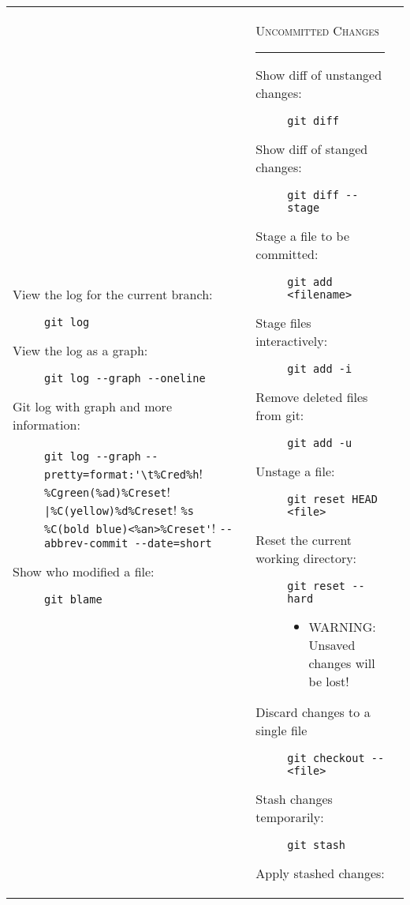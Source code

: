 \documentclass[landscape]{article}
\begin{document}
\begin{tabular*}{10.5in}{|p{2.9in}|p{2.9in}|p{2.9in}|}
\begin{flushleft}
\begin{description}
            \item[View the log for the current branch:]
                {\verb!git log!}
            \item[View the log as a graph:]
                {\verb!git log --graph --oneline!}
            \item[Git log with graph and more information:]
                 {\verb!git log --graph!
                  \verb!--pretty=format:'\t%Cred%h!
                  \verb!%Cgreen(%ad)%Creset!
                  \verb!|%C(yellow)%d%Creset!
                  \verb!%s %C(bold blue)<%an>%Creset'!
                  \verb!--abbrev-commit --date=short!}
            \item[Show who modified a file:]
                {\verb!git blame!}
        \end{description}
    \end{flushleft}
    &
    \begin{flushleft}
        \textsc{Uncommitted Changes}
        \rule{2.9in}{.5pt}
        \small
        \begin{description}
            \item[Show diff of unstanged changes:]
                {\verb!git diff!}
            \item[Show diff of stanged changes:]
                {\verb!git diff --stage!}
            \item[Stage a file to be committed:]
                {\verb!git add <filename>!}
            \item[Stage files interactively:]
                {\verb!git add -i!}
            \item[Remove deleted files from git:]
                {\verb!git add -u!}
            \item[Unstage a file:]
                {\verb!git reset HEAD <file>!}
            \item[Reset the current working directory:]
                {\verb!git reset --hard!}
                \begin{itemize}
                    \item{WARNING: Unsaved changes will be lost!}
                \end{itemize}
            \item[Discard changes to a single file]
                {\verb!git checkout -- <file>!}
            \item[Stash changes temporarily:]
                {\verb!git stash!}
            \item[Apply stashed changes:]

\end{description}
\end{flushleft}
\end{tabular*}
\end{document}
